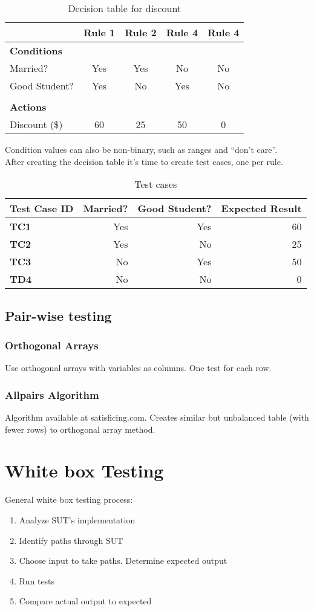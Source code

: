\documentclass[a4paper]{article}
\begin{document}
\begin{table}[H]
  \centering
  \begin{tabular}{|l|c|c|c|c|}
    \hline
    & \textbf{Rule 1} & \textbf{Rule 2} & \textbf{Rule 4} & \textbf{Rule 4}
    \\\hline
    \textbf{Conditions} & & & & \\\hline
    Married? & Yes & Yes & No & No \\\hline
    Good Student? & Yes & No & Yes & No \\\hline
    & & & & \\\hline
    \textbf{Actions} & & & & \\\hline
    Discount (\$) & 60 & 25 & 50 & 0 \\\hline
  \end{tabular}
  \caption{Decision table for discount}
  \label{tab:disount}
\end{table}
Condition values can also be non-binary, such as ranges and ``don't care''.\\
After creating the decision table it's time to create test cases, one per rule.
\begin{table}[H]
  \centering
  \begin{tabular}{|l|*{3}{r|}}
    \hline
    \textbf{Test Case ID} & \textbf{Married?} & \textbf{Good Student?} &
    \textbf{Expected Result} \\\hline
    \textbf{TC1} & Yes & Yes & 60 \\\hline
    \textbf{TC2} & Yes & No & 25 \\\hline
    \textbf{TC3} & No & Yes & 50 \\\hline
    \textbf{TD4} & No & No & 0 \\\hline
  \end{tabular}
  \caption{Test cases}
  \label{tab:testcasesdiscount}
\end{table}

\subsection{Pair-wise testing}
\subsubsection{Orthogonal Arrays}
Use orthogonal arrays with variables as columns. One test for each row.
\subsubsection{Allpairs Algorithm}
Algorithm available at satisficing.com. Creates similar but unbalanced table
(with fewer rows) to orthogonal array method.

\section{White box Testing}
General white box testing process:
\begin{enumerate}
  \item Analyze SUT's implementation
  \item Identify paths through SUT
  \item Choose input to take paths. Determine expected output
  \item Run tests
  \item Compare actual output to expected
\end{enumerate}
\end{document}
